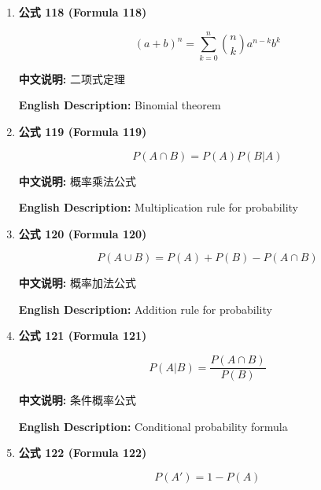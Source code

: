 \documentclass[12pt,a4paper]{article}
\begin{document}
\begin{enumerate}[leftmargin=*]
\vspace{0.5cm}

\item \textbf{公式 118 (Formula 118)}

\begin{equation}
(a+b)^n = \sum_{k=0}^n \binom{n}{k} a^{n-k} b^k
\end{equation}

\textbf{中文说明:} 二项式定理

\textbf{English Description:} Binomial theorem

\vspace{0.5cm}

\item \textbf{公式 119 (Formula 119)}

\begin{equation}
P(A \cap B) = P(A)P(B|A)
\end{equation}

\textbf{中文说明:} 概率乘法公式

\textbf{English Description:} Multiplication rule for probability

\vspace{0.5cm}

\item \textbf{公式 120 (Formula 120)}

\begin{equation}
P(A \cup B) = P(A) + P(B) - P(A \cap B)
\end{equation}

\textbf{中文说明:} 概率加法公式

\textbf{English Description:} Addition rule for probability

\vspace{0.5cm}

\item \textbf{公式 121 (Formula 121)}

\begin{equation}
P(A|B) = \frac{P(A \cap B)}{P(B)}
\end{equation}

\textbf{中文说明:} 条件概率公式

\textbf{English Description:} Conditional probability formula

\vspace{0.5cm}

\item \textbf{公式 122 (Formula 122)}

\begin{equation}
P(A') = 1 - P(A)
\end{equation}


\end{enumerate}
\end{document}
